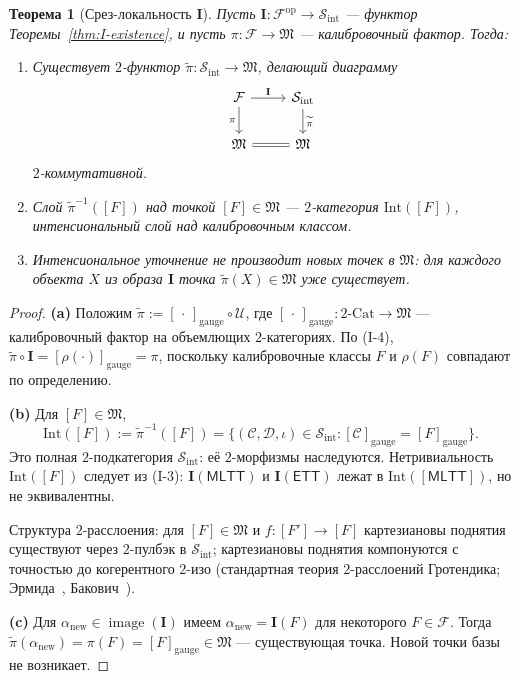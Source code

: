 \documentclass[11pt]{article}
\theoremstyle{plain}
\newtheorem{theorem}{Теорема}[section]
\theoremstyle{definition}
\newcommand{\cS}{\mathcal{S}}
\newcommand{\cF}{\mathcal{F}}
\newcommand{\cC}{\mathcal{C}}
\newcommand{\cD}{\mathcal{D}}
\newcommand{\fM}{\mathfrak{M}}
\newcommand{\Sint}{\cS_{\mathrm{int}}}
\newcommand{\Cat}{\mathrm{Cat}}
\newcommand{\MLTT}{\mathsf{MLTT}}
\newcommand{\ETT}{\mathsf{ETT}}
\newcommand{\II}{\mathbf{I}}
\newcommand{\cU}{\mathcal{U}}
\newcommand{\tpi}{\widetilde{\pi}}
\DeclareMathOperator{\image}{image}
\begin{document}
\begin{theorem}[Срез-локальность $\II$]\label{thm:slice-locality}
Пусть $\II : \cF^{\mathrm{op}} \to \Sint$ — функтор Теоремы~\ref{thm:I-existence}, и пусть $\pi : \cF \to \fM$ — калибровочный фактор. Тогда:
\begin{enumerate}
\item[\textbf{(a)}] Существует $2$-функтор $\tpi : \Sint \to \fM$, делающий диаграмму
\[
\begin{tikzcd}
\cF \arrow[r, "\II"] \arrow[d, "\pi"'] & \Sint \arrow[d, "\tpi"] \\
\fM \arrow[r, equal] & \fM
\end{tikzcd}
\]
$2$-коммутативной.
\item[\textbf{(b)}] Слой $\tpi^{-1}([F])$ над точкой $[F] \in \fM$ — $2$-категория $\mathrm{Int}([F])$, \emph{интенсиональный слой над калибровочным классом}.
\item[\textbf{(c)}] Интенсиональное уточнение не производит новых точек в $\fM$: для каждого объекта $X$ из образа $\II$ точка $\tpi(X) \in \fM$ уже существует.
\end{enumerate}
\end{theorem}

\begin{proof}

\textbf{(a)} Положим $\tpi := [\, \cdot \,]_{\mathrm{gauge}} \circ \cU$, где $[\, \cdot \,]_{\mathrm{gauge}} : 2\text{-}\Cat \to \fM$ — калибровочный фактор на объемлющих $2$-категориях. По (I-4), $\tpi \circ \II = [\rho(\cdot)]_{\mathrm{gauge}} = \pi$, поскольку калибровочные классы $F$ и $\rho(F)$ совпадают по определению.

\textbf{(b)} Для $[F] \in \fM$,
\[ \mathrm{Int}([F]) := \tpi^{-1}([F]) = \{(\cC, \cD, \iota) \in \Sint : [\cC]_{\mathrm{gauge}} = [F]_{\mathrm{gauge}}\}. \]
Это полная $2$-подкатегория $\Sint$: её $2$-морфизмы наследуются. Нетривиальность $\mathrm{Int}([F])$ следует из (I-3): $\II(\MLTT)$ и $\II(\ETT)$ лежат в $\mathrm{Int}([\MLTT])$, но не эквивалентны.

Структура $2$-расслоения: для $[F] \in \fM$ и $f : [F'] \to [F]$ картезиановы поднятия существуют через $2$-пулбэк в $\Sint$; картезиановы поднятия компонуются с точностью до когерентного $2$-изо (стандартная теория $2$-расслоений Гротендика; Эрмида~\cite{Hermida1999}, Бакович~\cite{Bakovic2010}).

\textbf{(c)} Для $\alpha_{\mathrm{new}} \in \image(\II)$ имеем $\alpha_{\mathrm{new}} = \II(F)$ для некоторого $F \in \cF$. Тогда $\tpi(\alpha_{\mathrm{new}}) = \pi(F) = [F]_{\mathrm{gauge}} \in \fM$ --- существующая точка. Новой точки базы не возникает.
\end{proof}
\end{document}
